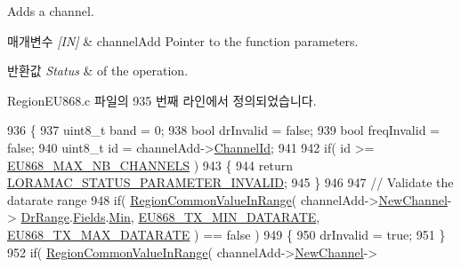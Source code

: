 Adds a channel. 


\begin{DoxyParams}{매개변수}
{\em \mbox{[}\+I\+N\mbox{]}} & channel\+Add Pointer to the function parameters.\\
\hline
\end{DoxyParams}

\begin{DoxyRetVals}{반환값}
{\em Status} & of the operation. \\
\hline
\end{DoxyRetVals}


Region\+E\+U868.\+c 파일의 935 번째 라인에서 정의되었습니다.


\begin{DoxyCode}
936 \{
937     uint8\_t band = 0;
938     \textcolor{keywordtype}{bool} drInvalid = \textcolor{keyword}{false};
939     \textcolor{keywordtype}{bool} freqInvalid = \textcolor{keyword}{false};
940     uint8\_t \textcolor{keywordtype}{id} = channelAdd->\mbox{\hyperlink{structs_channel_add_params_ae23f953dc29c360e56a3c856404a3276}{ChannelId}};
941 
942     \textcolor{keywordflow}{if}( \textcolor{keywordtype}{id} >= \mbox{\hyperlink{group___r_e_g_i_o_n_e_u868_gaf94c3090ac541fec3c97b2146702d252}{EU868\_MAX\_NB\_CHANNELS}} )
943     \{
944         \textcolor{keywordflow}{return} \mbox{\hyperlink{group___l_o_r_a_m_a_c_gga1d18f26b344040b3ec5c3db662919661ad0d3119f247d00e1787dda106fcb3017}{LORAMAC\_STATUS\_PARAMETER\_INVALID}};
945     \}
946 
947     \textcolor{comment}{// Validate the datarate range}
948     \textcolor{keywordflow}{if}( \mbox{\hyperlink{group___r_e_g_i_o_n_c_o_m_m_o_n_gafdd1c80d953e18d755a631b72a9c3bd3}{RegionCommonValueInRange}}( channelAdd->\mbox{\hyperlink{structs_channel_add_params_afc31493a105479490228fd896b20b45c}{NewChannel}}->
      \mbox{\hyperlink{structs_channel_params_ad4d9b041ea740886a05fa8a1d06997a2}{DrRange}}.\mbox{\hyperlink{unionu_dr_range_a5bdb9afc17112f2ae5f9548f0aee964f}{Fields}}.\mbox{\hyperlink{structu_dr_range_1_1s_fields_ad870086364c5eb410eec40e1025e3203}{Min}}, \mbox{\hyperlink{group___r_e_g_i_o_n_e_u868_ga2df2a8fc7db7e674c3e58de0dd1c90a4}{EU868\_TX\_MIN\_DATARATE}}, 
      \mbox{\hyperlink{group___r_e_g_i_o_n_e_u868_ga689495f3ecc7047ff636ec85b3b80ee3}{EU868\_TX\_MAX\_DATARATE}} ) == \textcolor{keyword}{false} )
949     \{
950         drInvalid = \textcolor{keyword}{true};
951     \}
952     \textcolor{keywordflow}{if}( \mbox{\hyperlink{group___r_e_g_i_o_n_c_o_m_m_o_n_gafdd1c80d953e18d755a631b72a9c3bd3}{RegionCommonValueInRange}}( channelAdd->\mbox{\hyperlink{structs_channel_add_params_afc31493a105479490228fd896b20b45c}{NewChannel}}->

\end{DoxyCode}
